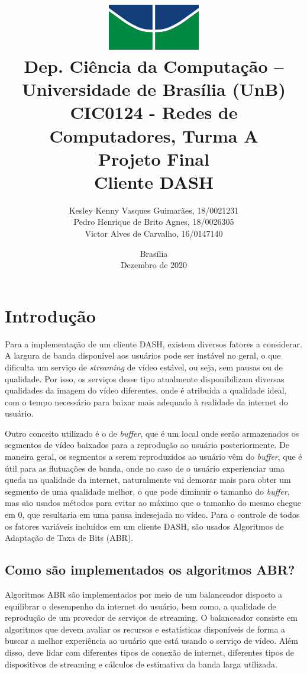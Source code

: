 \documentclass[12pt]{article}
\title{
        \includegraphics[width=4cm]{img/logo.jpg} \\ 
        \large
        Dep. Ciência da Computação -- Universidade de Brasília (UnB)\\
        CIC0124 - Redes de Computadores, Turma A \\
        \vfill 
        \vfill
        \LARGE
        \textbf{Projeto Final\\
        Cliente DASH}
        \vfill
    }
\author{
        Kesley Kenny Vasques Guimarães, 18/0021231\\
        Pedro Henrique de Brito Agnes, 18/0026305\\
        Victor Alves de Carvalho, 16/0147140
    }
\affil{
        \vfill
        \vfill
        \vfill
        Professor \\
        Dr. Marcos Fagundes Caetano
    }
\date{Brasília\\Dezembro de 2020}
\begin{document}
\maketitle
\newpage


\section{Introdução}
Para a implementação de um cliente DASH, existem diversos fatores a considerar. A largura de banda disponível aos usuários pode ser instável no geral, o que dificulta um serviço de \textit{streaming} de vídeo estável, ou seja, sem pausas ou de qualidade. Por isso, os serviços desse tipo atualmente disponibilizam diversas qualidades da imagem do vídeo diferentes, onde é atribuída a qualidade ideal, com o tempo necessário para baixar mais adequado à realidade da internet do usuário.


Outro conceito utilizado é o de \textit{buffer}, que é um local onde serão armazenados os segmentos de vídeo baixados para a reprodução ao usuário posteriormente. De maneira geral, os segmentos a serem reproduzidos ao usuário vêm do \textit{buffer}, que é útil para as flutuações de banda, onde no caso de o usuário experienciar uma queda na qualidade da internet, naturalmente vai demorar mais para obter um segmento de uma qualidade melhor, o que pode diminuir o tamanho do \textit{buffer}, mas são usados métodos para evitar ao máximo que o tamanho do mesmo chegue em 0, que resultaria em uma pausa indesejada no vídeo. Para o controle de todos os fatores variáveis incluídos em um cliente DASH, são usados Algoritmos de Adaptação de Taxa de Bits (ABR).

\subsection{Como são implementados os algoritmos ABR?}
Algoritmos ABR são implementados por meio de um balanceador disposto a equilibrar o desempenho da internet do usuário, bem como, a qualidade de reprodução de um provedor de serviços de streaming. O balanceador consiste em algoritmos que devem avaliar os recursos e estatísticas disponíveis de forma a buscar a melhor experiência ao usuário que está usando o serviço de vídeo. Além disso, deve lidar com diferentes tipos de conexão de internet, diferentes tipos de dispositivos de streaming e cálculos de estimativa da banda larga utilizada.
\end{document}

